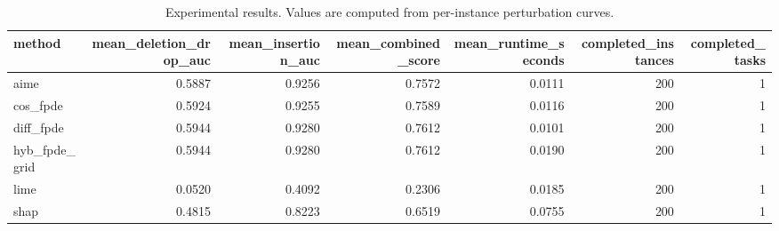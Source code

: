 \begin{table}[t]
\caption{Experimental results. Values are computed from per-instance perturbation curves.}
\label{tab:main_results_computed}
\centering
\begin{tabular}{lrrrrrr}
\toprule
method & mean\_deletion\_drop\_auc & mean\_insertion\_auc & mean\_combined\_score & mean\_runtime\_seconds & completed\_instances & completed\_tasks \\
\midrule
aime & 0.5887 & 0.9256 & 0.7572 & 0.0111 & 200 & 1 \\
cos\_fpde & 0.5924 & 0.9255 & 0.7589 & 0.0116 & 200 & 1 \\
diff\_fpde & 0.5944 & 0.9280 & 0.7612 & 0.0101 & 200 & 1 \\
hyb\_fpde\_grid & 0.5944 & 0.9280 & 0.7612 & 0.0190 & 200 & 1 \\
lime & 0.0520 & 0.4092 & 0.2306 & 0.0185 & 200 & 1 \\
shap & 0.4815 & 0.8223 & 0.6519 & 0.0755 & 200 & 1 \\
\bottomrule
\end{tabular}

\end{table}
